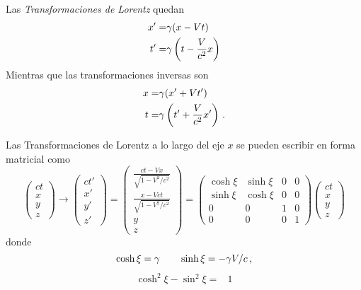 \begin{frame}
Las \emph{Transformaciones de Lorentz} quedan
\begin{align}
  \label{eq:lorentz}
  x'=&\gamma(x-V t)\nonumber\\
  t'=&\gamma\left(t-\frac{V}{c^2}x\right)
\end{align}
Mientras que las transformaciones inversas son
\begin{align}
  \label{eq:lorentzinv}
  x=&\gamma(x'+V t')\nonumber\\
  t=&\gamma\left(t'+\frac{V}{c^2}x'\right)\,.
\end{align}


Las Transformaciones de Lorentz  a lo largo del eje $x$ se pueden escribir en forma matricial como
\begin{equation}
\label{eq:147qft}
  \begin{pmatrix}
    ct\\
    x\\
    y\\
    z
  \end{pmatrix}\to
  \begin{pmatrix}
    ct'\\
    x'\\
    y'\\
    z'
  \end{pmatrix}=
  \begin{pmatrix}
    \frac{ct-Vx}{\sqrt{1-V^2/c^2}}\\
    \frac{x-Vct}{\sqrt{1-V^2/c^2}}\\
    y\\
    z
  \end{pmatrix}=
  \begin{pmatrix}
    \cosh\xi&\sinh\xi&0&0\\
    \sinh\xi&\cosh\xi&0&0\\
    0     &  0  &1&0\\
    0     &  0  &0&1
  \end{pmatrix}
  \begin{pmatrix}
    ct\\
    x\\
    y\\
    z
  \end{pmatrix}
\end{equation}
donde
\begin{equation}
  \cosh\xi=\gamma\qquad\sinh\xi=-\gamma V/c\,,
\end{equation}
\begin{align*}
\cosh^2\xi-\sin^2\xi=&1\nonumber\\

\end{align*}
\end{frame}
